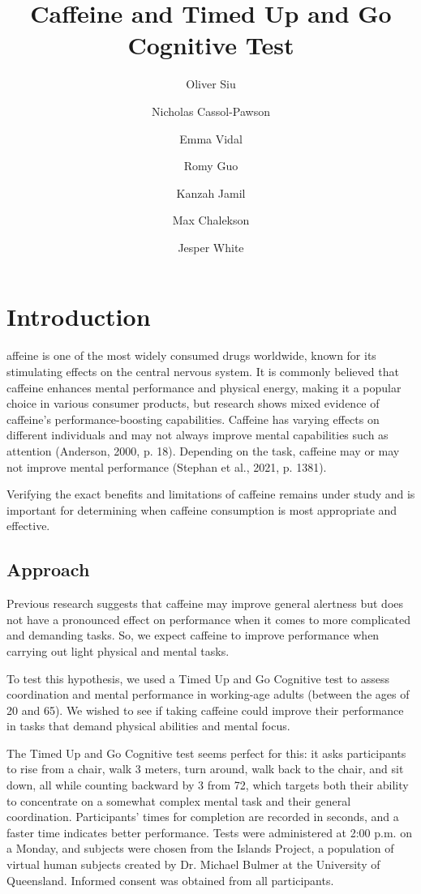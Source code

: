 \documentclass[11pt,a4paper,twoside]{tau-book}
\title{Caffeine and Timed Up and Go Cognitive Test}
\author[a,c]{\small Oliver Siu}
\author[a,c,d]{Nicholas Cassol-Pawson}
\author[a,b,c]{Emma Vidal}
\author[a,c]{Romy Guo}
\author[a,b,c]{Kanzah Jamil}
\author[a,c]{Max Chalekson}
\author[a,c,d]{Jesper White}
\affil[a]{University of California, Los Angeles (UCLA)}
\affil[b]{Department of Mathematics}
\affil[c]{Department of Statistics \& Data Science}
\affil[d]{Department of Economics}
\begin{document}
	
    \maketitle
    \thispagestyle{firststyle}



\section{Introduction}
    affeine is one of the most widely consumed drugs worldwide, known for its stimulating effects on the central nervous system. It is commonly believed that caffeine enhances mental performance and physical energy, making it a popular choice in various consumer products, but research shows mixed evidence of caffeine’s performance-boosting capabilities. Caffeine has varying effects on different individuals and may not always improve mental capabilities such as attention \cite{Anderson2000} (Anderson, 2000, p. 18). Depending on the task, caffeine may or may not improve mental performance \cite{Stepan2021} (Stephan et al., 2021, p. 1381).
    
    Verifying the exact benefits and limitations of caffeine remains under study and is important for determining when caffeine consumption is most appropriate and effective.
    
    \subsection{Approach}
    Previous research suggests that caffeine may improve general alertness but does not have a pronounced effect on performance when it comes to more complicated and demanding tasks. So, we expect caffeine to improve performance when carrying out light physical and mental tasks. 
    
    To test this hypothesis, we used a Timed Up and Go Cognitive test to assess coordination and mental performance in working-age adults (between the ages of 20 and 65). We wished to see if taking caffeine could improve their performance in tasks that demand physical abilities and mental focus. 
    
    The Timed Up and Go Cognitive test seems perfect for this: it asks participants to rise from a chair, walk 3 meters, turn around, walk back to the chair, and sit down, all while counting backward by 3 from 72, which targets both their ability to concentrate on a somewhat complex mental task and their general coordination. Participants’ times for completion are recorded in seconds, and a faster time indicates better performance. Tests were administered at 2:00 p.m. on a Monday, and subjects were chosen from the Islands Project, a population of virtual human subjects created by Dr. Michael Bulmer at the University of Queensland. Informed consent was obtained from all participants.
\end{document}
